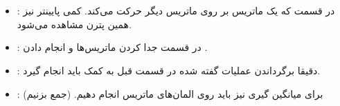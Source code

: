 \section{}
\begin{itemize}
    \item \textbf{}: در قسمت  که یک ماتریس بر روی ماتریس دیگر حرکت می‌کند. کمی پایینتر نیز همین پترن مشاهده می‌شود.
    \item \textbf{}: در قسمت  جدا کردن ماتریس‌ها و انجام دادن .
    \item \textbf{}: دقیقا برگرداندن عملیات گفته شده در قسمت قبل به کمک  باید انجام گیرد.
    \item \textbf{}: برای میانگین گیری نیز باید  روی المان‌های ماتریس انجام دهیم. (جمع بزنیم)
\end{itemize}
